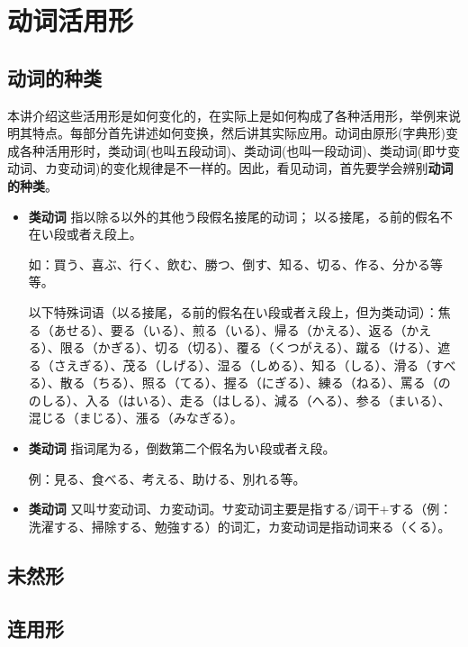 \section{动词活用形}

\subsection*{动词的种类}

本讲介绍这些活用形是如何变化的，在实际上是如何构成了各种活用形，举例来说明其特点。每部分首先讲述如何变换，然后讲其实际应用。动词由原形(字典形)变成各种活用形时，\I 类动词(也叫五段动词)、\II 类动词(也叫一段动词)、\III 类动词(即サ变动词、カ变动词)的变化规律是不一样的。因此，看见动词，首先要学会辨别{\bfseries 动词的种类}。

\begin{itemize}
    \item {\bfseries \I 类动词} 指以除る以外的其他う段假名接尾的动词； 以る接尾，る前的假名不在い段或者え段上。
    
    如：買う、喜ぶ、行く、飲む、勝つ、倒す、知る、切る、作る、分かる等等。

    以下特殊词语（以る接尾，る前的假名在い段或者え段上，但为{\I 类动词}）：焦る（あせる）、要る（いる）、煎る（いる）、帰る（かえる）、返る（かえる）、限る（かぎる）、切る（切る）、覆る（くつがえる）、蹴る（ける）、遮る（さえぎる）、茂る（しげる）、湿る（しめる）、知る（しる）、滑る（すべる）、散る（ちる）、照る（てる）、握る（にぎる）、練る（ねる）、罵る（ののしる）、入る（はいる）、走る（はしる）、減る（へる）、参る（まいる）、混じる（まじる）、漲る（みなぎる）。

    \item {\bfseries \II 类动词} 指词尾为る，倒数第二个假名为い段或者え段。
    
    例：見る、食べる、考える、助ける、別れる等。

    \item {\bfseries \III 类动词} 又叫サ変动词、カ変动词。サ変动词主要是指する/词干+する（例：洗濯する、掃除する、勉強する）的词汇，カ変动词是指动词来る（くる）。
    
\end{itemize}

\subsection{未然形}

\subsection{连用形}

